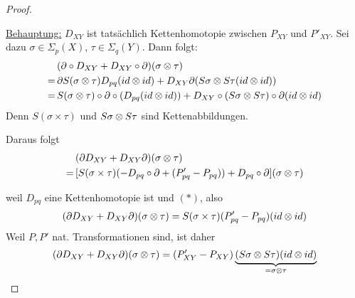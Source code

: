 \begin{proof}
\begin{enumerate}
	\underline{Behauptung:} $D_{XY}$ ist tatsächlich Kettenhomotopie zwischen $P_{XY}$ und $P'_{XY}$.
	Sei dazu $\sigma \in \Sigma_p(X)$, $\tau \in \Sigma_q(Y)$.
	Dann folgt:
	\begin{align*}
		& (\partial \circ D_{XY} + D_{XY} \circ \partial) (\sigma \otimes \tau) \\
		=\, & \partial S(\sigma \otimes \tau) D_{pq}(id \otimes id) + D_{XY} \partial (S\sigma \otimes S\tau (id \otimes id)) \\
		=\, & S(\sigma \otimes \tau) \circ \partial \circ (D_{pq} (id \otimes id)) + D_{XY} \circ (S\sigma \otimes S\tau) \circ \partial (id \otimes id)
	\end{align*}
	 Denn $S(\sigma \times \tau)$ und $S\sigma \otimes S\tau$ sind Kettenabbildungen.
	\end{enumerate}
	
	Daraus folgt
	\begin{align*}
		&(\partial D_{XY} + D_{XY}\partial)(\sigma \otimes \tau) \\
		=\, & [S(\sigma \times \tau)(-D_{pq} \circ \partial + (P'_{pq} - P_{pq})) + D_{pq}\circ \partial](\sigma \otimes \tau)
	\end{align*}
	
	weil $D_{pq}$ eine Kettenhomotopie ist und $(\ast)$, also
	\begin{align*}
		(\partial D_{XY} + D_{XY} \partial) (\sigma \otimes \tau) = S(\sigma \times \tau)(P'_{pq} - P_{pq})(id \otimes id)
	\end{align*}
	Weil $P, P'$ nat. Transformationen sind, ist daher
	\begin{align*}
		(\partial D_{XY} + D_{XY} \partial) (\sigma \otimes \tau) = (P'_{XY} - P_{XY})\underbrace{(S\sigma \otimes S\tau)(id \otimes id)}_{= \sigma \otimes \tau}
	\end{align*}
\end{proof}